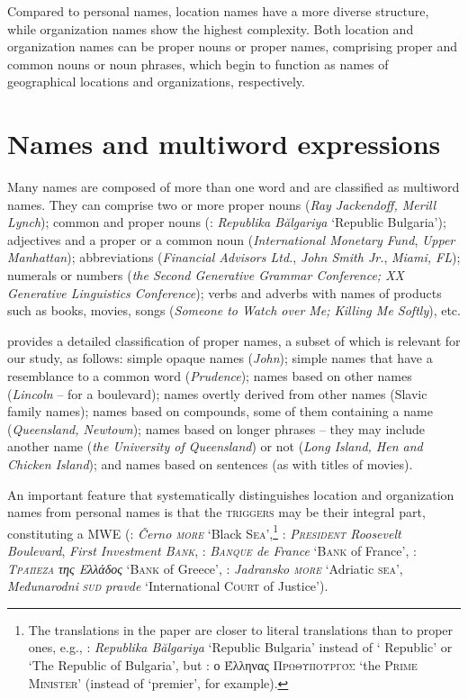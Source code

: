 \documentclass[output=paper]{langsci/langscibook}
\newcommand{\trigger}[1]{\textsc{#1}}
\begin{document}
Compared to personal names, location names have a more diverse
structure, while organization names show the highest complexity. Both
location and organization names can be proper nouns or proper names,
comprising proper and common nouns or noun phrases, which begin to
function as names of geographical locations and organizations,
respectively.

\section{Names and multiword expressions}


Many names are composed of more than one word and are classified as
multiword names. They can comprise two or more proper nouns
(\textit{Ray Jackendoff, Merill Lynch}); common and proper nouns (:
\textit{Republika Bălgariya} ‘Republic Bulgaria’); adjectives and a
proper or a common noun (\textit{International Monetary Fund},
\textit{Upper Manhattan}); abbreviations (\textit{Financial Advisors
Ltd.}, \textit{John Smith Jr.}, \textit{Miami, FL}); numerals or
numbers (\textit{the Second Generative Grammar Conference; XX
Generative Linguistics Conference}); verbs and adverbs with names of
products such as books, movies, songs (\textit{Someone to Watch over
Me; Killing Me Softly}), etc.

\cite{anderson2007} provides a detailed classification of proper names, a
subset of which is relevant for our study, as follows: simple opaque
names (\textit{John}); simple names that have a resemblance to a common
word (\textit{Prudence}); names based on other names (\textit{Lincoln}
– for a boulevard); names overtly derived from other names (Slavic
family names); names based on compounds, some of them containing a name
(\textit{Queensland, Newtown}); names based on longer phrases – they
may include another name (\textit{the University of Queensland}) or not
(\textit{Long Island, Hen and Chicken Island}); and names based on
sentences (as with titles of movies).

An important feature that systematically distinguishes location and
organization names from personal names is that the \trigger{triggers} may
be their integral part, constituting a MWE (:
\textit{Černo \trigger{more}} `Black \trigger{Sea}’,\footnote{The translations in the paper are closer to literal translations than to proper ones, e.g., : \textit{Republika Bălgariya} ‘Republic Bulgaria’ instead of ` Republic' or `The Republic of Bulgaria', but : ο Έλληνας \trigger{Πρωθυπουργός}  `the  \trigger{Prime Minister'} (instead of `premier',
for example).}
: \textit{\trigger{President} Roosevelt Boulevard}, \textit{First Investment \trigger{Bank}},
: \textit{\trigger{Banque} de France} ‘\trigger{Bank} of France’, 
: \textit{\trigger{Τράπεζα} της Ελλάδος} ‘\trigger{Bank} of Greece’, 
: \textit{Jadransko \trigger{more}} ‘Adriatic \trigger{sea}’, \textit{Međunarodni} \textit{\trigger{sud}}
\textit{pravde} ‘International \trigger{Court} of Justice’).
\end{document}
